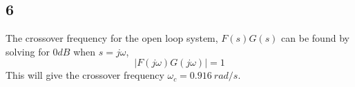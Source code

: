 \documentclass[12pt,a4paper]{article}
\begin{document}
  \subsection{6}
  The crossover frequency for the open loop system, $F(s)G(s)$ can be
  found by solving for $0dB$ when $s=j\omega$,
  \begin{equation}
    |F(j\omega)G(j\omega)|=1
  \end{equation}
  This will give the crossover frequency $\omega_c=0.916\:rad/s$.
\end{document}
